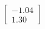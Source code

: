 \documentclass[preview]{standalone}
\begin{document}
\begin{align*}
\begin{bmatrix} -1.04 \\ 1.30 \end{bmatrix}
\end{align*}
\end{document}
